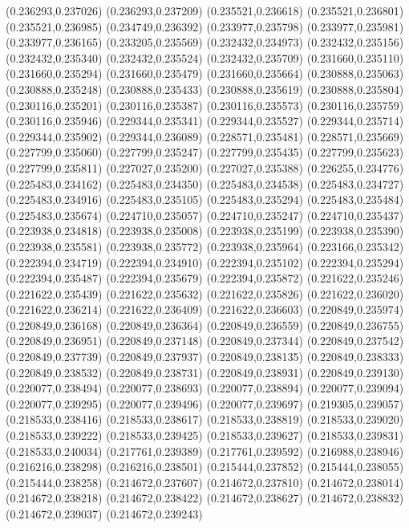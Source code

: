 (0.236293,0.237026)
(0.236293,0.237209)
(0.235521,0.236618)
(0.235521,0.236801)
(0.235521,0.236985)
(0.234749,0.236392)
(0.233977,0.235798)
(0.233977,0.235981)
(0.233977,0.236165)
(0.233205,0.235569)
(0.232432,0.234973)
(0.232432,0.235156)
(0.232432,0.235340)
(0.232432,0.235524)
(0.232432,0.235709)
(0.231660,0.235110)
(0.231660,0.235294)
(0.231660,0.235479)
(0.231660,0.235664)
(0.230888,0.235063)
(0.230888,0.235248)
(0.230888,0.235433)
(0.230888,0.235619)
(0.230888,0.235804)
(0.230116,0.235201)
(0.230116,0.235387)
(0.230116,0.235573)
(0.230116,0.235759)
(0.230116,0.235946)
(0.229344,0.235341)
(0.229344,0.235527)
(0.229344,0.235714)
(0.229344,0.235902)
(0.229344,0.236089)
(0.228571,0.235481)
(0.228571,0.235669)
(0.227799,0.235060)
(0.227799,0.235247)
(0.227799,0.235435)
(0.227799,0.235623)
(0.227799,0.235811)
(0.227027,0.235200)
(0.227027,0.235388)
(0.226255,0.234776)
(0.225483,0.234162)
(0.225483,0.234350)
(0.225483,0.234538)
(0.225483,0.234727)
(0.225483,0.234916)
(0.225483,0.235105)
(0.225483,0.235294)
(0.225483,0.235484)
(0.225483,0.235674)
(0.224710,0.235057)
(0.224710,0.235247)
(0.224710,0.235437)
(0.223938,0.234818)
(0.223938,0.235008)
(0.223938,0.235199)
(0.223938,0.235390)
(0.223938,0.235581)
(0.223938,0.235772)
(0.223938,0.235964)
(0.223166,0.235342)
(0.222394,0.234719)
(0.222394,0.234910)
(0.222394,0.235102)
(0.222394,0.235294)
(0.222394,0.235487)
(0.222394,0.235679)
(0.222394,0.235872)
(0.221622,0.235246)
(0.221622,0.235439)
(0.221622,0.235632)
(0.221622,0.235826)
(0.221622,0.236020)
(0.221622,0.236214)
(0.221622,0.236409)
(0.221622,0.236603)
(0.220849,0.235974)
(0.220849,0.236168)
(0.220849,0.236364)
(0.220849,0.236559)
(0.220849,0.236755)
(0.220849,0.236951)
(0.220849,0.237148)
(0.220849,0.237344)
(0.220849,0.237542)
(0.220849,0.237739)
(0.220849,0.237937)
(0.220849,0.238135)
(0.220849,0.238333)
(0.220849,0.238532)
(0.220849,0.238731)
(0.220849,0.238931)
(0.220849,0.239130)
(0.220077,0.238494)
(0.220077,0.238693)
(0.220077,0.238894)
(0.220077,0.239094)
(0.220077,0.239295)
(0.220077,0.239496)
(0.220077,0.239697)
(0.219305,0.239057)
(0.218533,0.238416)
(0.218533,0.238617)
(0.218533,0.238819)
(0.218533,0.239020)
(0.218533,0.239222)
(0.218533,0.239425)
(0.218533,0.239627)
(0.218533,0.239831)
(0.218533,0.240034)
(0.217761,0.239389)
(0.217761,0.239592)
(0.216988,0.238946)
(0.216216,0.238298)
(0.216216,0.238501)
(0.215444,0.237852)
(0.215444,0.238055)
(0.215444,0.238258)
(0.214672,0.237607)
(0.214672,0.237810)
(0.214672,0.238014)
(0.214672,0.238218)
(0.214672,0.238422)
(0.214672,0.238627)
(0.214672,0.238832)
(0.214672,0.239037)
(0.214672,0.239243)

